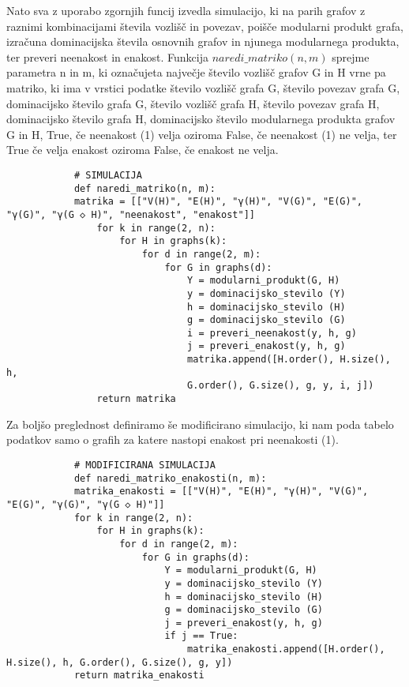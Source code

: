 \documentclass[a4paper,12pt]{article}
\begin{document}
Nato sva z uporabo zgornjih funcij izvedla simulacijo, ki na parih grafov z raznimi kombinacijami števila 
vozlišč in povezav, poišče modularni produkt grafa, izračuna dominacijska števila osnovnih grafov in njunega 
modularnega produkta, ter preveri neenakost in enakost. Funkcija $naredi\_matriko(n, m)$ sprejme parametra n in m, 
ki označujeta največje število vozlišč grafov G in H vrne pa matriko, ki ima v vrstici podatke 
število vozlišč grafa G, število povezav grafa G, dominacijsko število grafa G, 
število vozlišč grafa H, število povezav grafa H, dominacijsko število grafa H, 
dominacijsko število modularnega produkta grafov G in H, True, če neenakost (1) velja oziroma False, če neenakost (1) ne velja,
ter True če velja enakost oziroma False, če enakost ne velja. 


\begingroup
\makeatletter
\@totalleftmargin=-5cm
    \begin{small}
        \begin{verbatim}
            # SIMULACIJA
            def naredi_matriko(n, m):
            matrika = [["V(H)", "E(H)", "γ(H)", "V(G)", "E(G)", "γ(G)", "γ(G ◇ H)", "neenakost", "enakost"]]
                for k in range(2, n):
                    for H in graphs(k):
                        for d in range(2, m):
                            for G in graphs(d):
                                Y = modularni_produkt(G, H)
                                y = dominacijsko_stevilo (Y)
                                h = dominacijsko_stevilo (H)
                                g = dominacijsko_stevilo (G)
                                i = preveri_neenakost(y, h, g)
                                j = preveri_enakost(y, h, g)
                                matrika.append([H.order(), H.size(), h, 
                                G.order(), G.size(), g, y, i, j])
                return matrika
        \end{verbatim}
    \end{small}
\endgroup

Za boljšo preglednost definiramo še modificirano simulacijo, ki nam poda tabelo podatkov
samo o grafih za katere nastopi enakost pri neenakosti (1).

\begingroup
\makeatletter
\@totalleftmargin=-5cm
    \begin{small}
        \begin{verbatim}
            # MODIFICIRANA SIMULACIJA
            def naredi_matriko_enakosti(n, m):
            matrika_enakosti = [["V(H)", "E(H)", "γ(H)", "V(G)", "E(G)", "γ(G)", "γ(G ◇ H)"]]
            for k in range(2, n):
                for H in graphs(k):
                    for d in range(2, m):
                        for G in graphs(d):
                            Y = modularni_produkt(G, H)
                            y = dominacijsko_stevilo (Y)
                            h = dominacijsko_stevilo (H)
                            g = dominacijsko_stevilo (G)
                            j = preveri_enakost(y, h, g)
                            if j == True:
                                matrika_enakosti.append([H.order(), H.size(), h, G.order(), G.size(), g, y])
            return matrika_enakosti
        \end{verbatim}
    \end{small}
\endgroup
\end{document}

